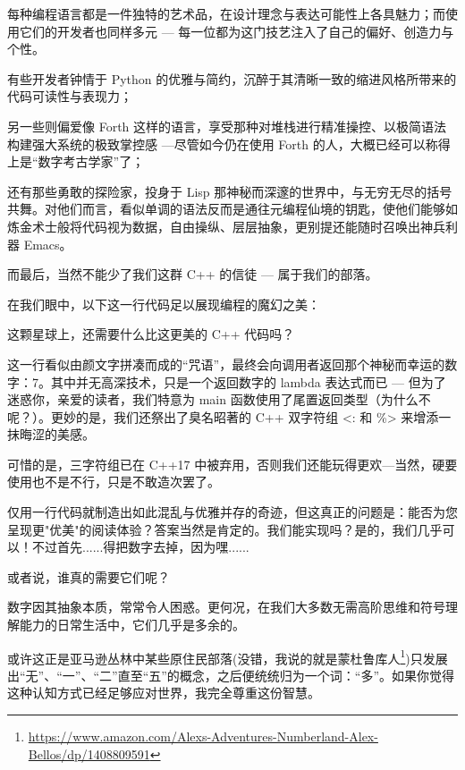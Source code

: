 
每种编程语言都是一件独特的艺术品，在设计理念与表达可能性上各具魅力；而使用它们的开发者也同样多元 --- 每一位都为这门技艺注入了自己的偏好、创造力与个性。

有些开发者钟情于 Python 的优雅与简约，沉醉于其清晰一致的缩进风格所带来的代码可读性与表现力；

另一些则偏爱像 Forth 这样的语言，享受那种对堆栈进行精准操控、以极简语法构建强大系统的极致掌控感 ---尽管如今仍在使用 Forth 的人，大概已经可以称得上是“数字考古学家”了；

还有那些勇敢的探险家，投身于 Lisp 那神秘而深邃的世界中，与无穷无尽的括号共舞。对他们而言，看似单调的语法反而是通往元编程仙境的钥匙，使他们能够如炼金术士般将代码视为数据，自由操纵、层层抽象，更别提还能随时召唤出神兵利器 Emacs。

而最后，当然不能少了我们这群 C++ 的信徒 --- 属于我们的部落。

在我们眼中，以下这一行代码足以展现编程的魔幻之美：

\begin{cpp}
auto main()->int{return<:]<class _>(_)->_<%
\end{cpp}

这颗星球上，还需要什么比这更美的 C++ 代码吗？

这一行看似由颜文字拼凑而成的“咒语”，最终会向调用者返回那个神秘而幸运的数字：7。其中并无高深技术，只是一个返回数字的 lambda 表达式而已 --- 但为了迷惑你，亲爱的读者，我们特意为 main 函数使用了尾置返回类型（为什么不呢？）。更妙的是，我们还祭出了臭名昭著的 C++ 双字符组 <: 和 \%> 来增添一抹晦涩的美感。

可惜的是，三字符组已在 C++17 中被弃用，否则我们还能玩得更欢---当然，硬要使用也不是不行，只是不敢造次罢了。

仅用一行代码就制造出如此混乱与优雅并存的奇迹，但这真正的问题是：能否为您呈现更"优美"的阅读体验？答案当然是肯定的。我们能实现吗？是的，我们几乎可以！不过首先......得把数字去掉，因为嘿......


或者说，谁真的需要它们呢？

数字因其抽象本质，常常令人困惑。更何况，在我们大多数无需高阶思维和符号理解能力的日常生活中，它们几乎是多余的。

或许这正是亚马逊丛林中某些原住民部落(没错，我说的就是蒙杜鲁库人\footnote{\url{https://www.amazon.com/Alexs-Adventures-Numberland-Alex-Bellos/dp/1408809591}})只发展出“无”、“一”、“二”直至“五”的概念，之后便统统归为一个词：“多”。如果你觉得这种认知方式已经足够应对世界，我完全尊重这份智慧。

